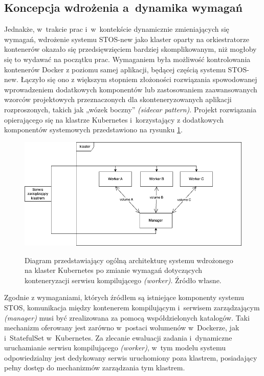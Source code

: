 \subsection{Koncepcja wdrożenia a~dynamika wymagań}
Jednakże, w~trakcie prac i~w~kontekście dynamicznie zmieniających się wymagań, wdrożenie systemu STOS-new jako klaster oparty na orkiestratorze kontenerów okazało się przedsięwzięciem bardziej skomplikowanym, niż mogłoby się to wydawać na początku prac. Wymaganiem była możliwość kontrolowania kontenerów Docker z poziomu samej aplikacji, będącej częścią systemu STOS-new. Łączyło się ono z większym stopniem złożoności rozwiązania spowodowanej wprowadzeniem dodatkowych komponentów lub zastosowaniem zaawansowanych wzorców projektowych przeznaczonych dla skonteneryzowanych aplikacji rozproszonych, takich jak „wózek boczny” \textit{(sidecar pattern)}\cite{k8sPatterns}. Projekt rozwiązania opierającego się na klastrze Kubernetes i~korzystający z dodatkowych komponentów systemowych przedstawiono na rysunku \ref{diagramk8sFinal}.

\begin{figure}[!h]
	\begin{center}
		\resizebox{0.7\textwidth}{!} {
			\includegraphics{img/4/k8sFinal.png}
		}
		\caption[Diagram prototypu klastra Kubernetes po zmianie architektury]{Diagram przedstawiający ogólną architekturę systemu wdrożonego na klaster Kubernetes po zmianie wymagań dotyczących konteneryzacji serwisu kompilującego \textit{(worker)}. Źródło własne.}
		\label{diagramk8sFinal}
	\end{center}
\end{figure}

Zgodnie z wymaganiami, których źródłem są istniejące komponenty systemu STOS, komunikacja między kontenerem kompilującym i~serwisem zarządzającym \textit{(manager)} musi być zrealizowana za pomocą współdzielonych katalogów. Taki mechanizm oferowany jest zarówno w~postaci wolumenów w~Dockerze\cite{dockerVolume}, jak i~StatefulSet w~Kubernetes\cite{k8sStateful}. Za zlecanie ewaluacji zadania i~dynamiczne uruchamianie serwisu kompilującego \textit{(worker)}, w~tym modelu systemu odpowiedzialny jest dedykowany serwis uruchomiony poza klastrem, posiadający pełny dostęp do mechanizmów zarządzania tym klastrem.

